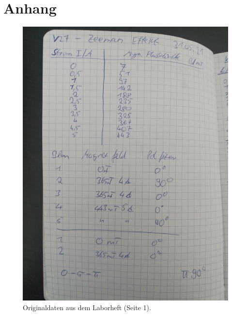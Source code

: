 \section{Anhang}
\begin{figure}
    \centering
    \includegraphics[width=\textwidth]{content/data/daten1.jpg}
    \caption{Originaldaten aus dem Laborheft (Seite 1).}
\end{figure}